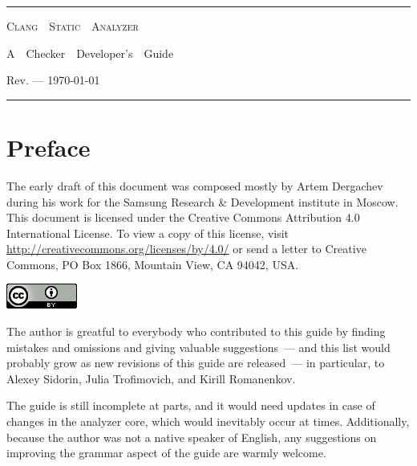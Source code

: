 \documentclass[a4paper,12pt]{article}
\begin{document}
\begin{center}
\hrule\bigskip\bigskip
{\Huge\textsc{Clang\ \ Static\ \ Analyzer}}
\bigskip

{\Large A\ \ Checker\ \ Developer's\ \ Guide}
\bigskip

{Rev. --- \today}
\bigskip\bigskip\hrule

\end{center}

\newpage
\tableofcontents

\newpage
\section{Preface}

The early draft of this document was composed mostly by Artem Dergachev during his work for the Samsung Research \& Development institute in Moscow. This document is licensed under the Creative Commons Attribution 4.0 International License. To view a copy of this license, visit \url{http://creativecommons.org/licenses/by/4.0/} or send a letter to Creative Commons, PO Box 1866, Mountain View, CA 94042, USA.
{\begin{center}\includegraphics{license.png}\end{center}}

The author is greatful to everybody who contributed to this guide by finding mistakes and omissions and giving valuable suggestions~--- and this list would probably grow as new revisions of this guide are released~--- in particular, to Alexey Sidorin, Julia Trofimovich, and Kirill Romanenkov.

The guide is still incomplete at parts, and it would need updates in case of changes in the analyzer core, which would inevitably occur at times. Additionally, because the author was not a native speaker of English, any suggestions on improving the grammar aspect of the guide are warmly welcome.
\end{document}
